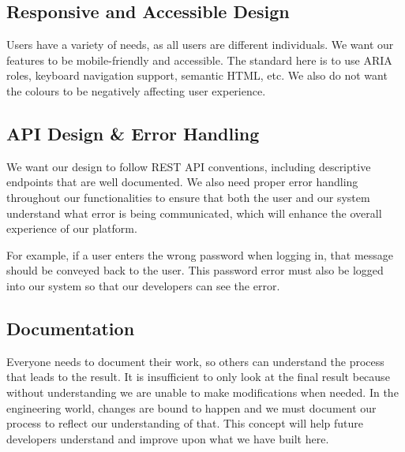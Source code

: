 \documentclass{article}
\begin{document}
\subsection{Responsive and Accessible Design}
Users have a variety of needs, as all users are different individuals. We want our features to be mobile-friendly and accessible. The standard here is to use ARIA roles, keyboard navigation support, semantic HTML, etc. We also do not want the colours to be negatively affecting user experience.

\subsection{API Design \& Error Handling}
We want our design to follow REST API conventions, including descriptive endpoints that are well documented. We also need proper error handling throughout our functionalities to ensure that both the user and our system understand what error is being communicated, which will enhance the overall experience of our platform.

For example, if a user enters the wrong password when logging in, that message should be conveyed back to the user. This password error must also be logged into our system so that our developers can see the error.

\subsection{Documentation}
Everyone needs to document their work, so others can understand the process that leads to the result. It is insufficient to only look at the final result because without understanding we are unable to make modifications when needed. In the engineering world, changes are bound to happen and we must document our process to reflect our understanding of that. This concept will help future developers understand and improve upon what we have built here.

\newpage{}
\end{document}
